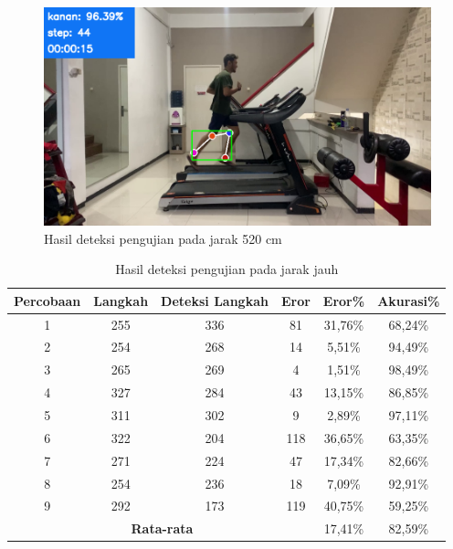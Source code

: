 \begin{figure}[H]
  \centering
  \includegraphics[scale=0.46]{gambar/jarak_jauh2.png}
  \caption{Hasil deteksi pengujian pada jarak 520 cm}
  \label{fig:PengujianJarakJauh2}
\end{figure}

\begin{longtable}{|c|c|c|c|c|c|}
  \caption{Hasil deteksi pengujian pada jarak jauh}
  \label{tb:PengujianJarakJauhAnalisaDeteksi}                                   \\
  \hline
  \rowcolor[HTML]{C0C0C0}
  \textbf{Percobaan} & \textbf{Langkah} & \textbf{Deteksi Langkah} & \textbf{Eror} & \textbf{Eror\%} & \textbf{Akurasi\%} \\
  \hline
  1   & 255   & 336 & 81   & 31,76\%    & 68,24\%   \\
  \hline
  2   & 254   & 268 & 14   & 5,51\%     & 94,49\%   \\
  \hline
  3   & 265   & 269 & 4    & 1,51\%     & 98,49\%     \\
  \hline
  4   & 327   & 284 & 43   & 13,15\%    & 86,85\%   \\
  \hline
  5   & 311   & 302 & 9    & 2,89\%     & 97,11\%   \\
  \hline
  6   & 322   & 204 & 118  & 36,65\%    & 63,35\%   \\
  \hline
  7   & 271   & 224 & 47   & 17,34\%    & 82,66\%   \\
  \hline
  8   & 254   & 236 & 18   & 7,09\%     & 92,91\%   \\
  \hline
  9   & 292   & 173 & 119  & 40,75\%   & 59,25\%   \\
  \hline

  \multicolumn{4}{|c|}{\textbf{Rata-rata}} & 17,41\% & 82,59\% \\
  \hline
\end{longtable}
\clearpage

